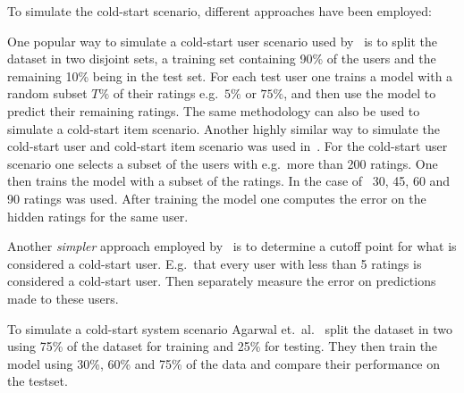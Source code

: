 To simulate the cold-start scenario, different approaches have been employed:

One popular way to simulate a cold-start user scenario used by~\cite{Stern2009,
Lam2008} is to split the dataset in two disjoint sets, a training set
containing 90\% of the users and the remaining 10\% being in the test set. For
each test user one trains a model with a random subset $T\%$ of their ratings
e.g.\ $5\%$ or $75\%$, and then use the model to predict their remaining
ratings. The same methodology can also be used to simulate a cold-start item
scenario. Another highly similar way to simulate the cold-start user and
cold-start item scenario was used in~\cite{Rashid2002, Rashid2008}. For the
cold-start user scenario one selects a subset of the users with e.g.\ more than
200 ratings. One then trains the model with a subset of the ratings. In the
case of~\cite{Rashid2002} 30, 45, 60 and 90 ratings was used. After training
the model one computes the error on the hidden ratings for the same user.

Another \emph{simpler} approach employed by~\cite{Massa2007, Jamali2009} is to
determine a cutoff point for what is considered a cold-start user. E.g.\ that
every user with less than 5 ratings is considered a cold-start user. Then
separately measure the error on predictions made to these users.

To simulate a cold-start system scenario Agarwal et.\ al.~\cite{Agarwal2009}
split the dataset in two using 75\% of the dataset for training and 25\% for
testing. They then train the model using 30\%, 60\% and 75\% of the data and
compare their performance on the testset.




